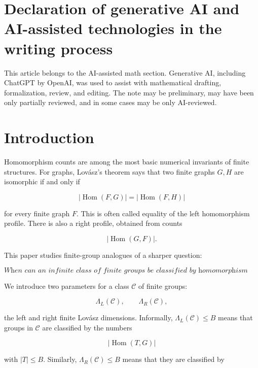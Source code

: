 \documentclass[11pt]{article}
\begin{document}
\begin{abstract}
\[
\operatorname{End}(Q)=\operatorname{Aut}(Q)\cup\{0\},
\]

and $V^Q=0$, then the coprime affine groups $V\rtimes Q$ satisfy both two-object test properties. The proof reduces hom-counts to a positive-definite exponential kernel on semisimple multiplicity vectors.
\end{abstract}

\section*{Declaration of generative AI and AI-assisted technologies in the writing process}
This article belongs to the AI-assisted math section. Generative AI, including ChatGPT by \mbox{OpenAI}, was used to assist with mathematical drafting, formalization, review, and editing. The note may be preliminary, may have been only partially reviewed, and in some cases may be only AI-reviewed.

\section{Introduction}

Homomorphism counts are among the most basic numerical invariants of finite structures. For graphs, Lovász's theorem says that two finite graphs $G,H$ are isomorphic if and only if

\[
|\operatorname{Hom}(F,G)|=|\operatorname{Hom}(F,H)|
\]

for every finite graph $F$. This is often called equality of the left homomorphism profile. There is also a right profile, obtained from counts

\[
|\operatorname{Hom}(G,F)|.
\]

This paper studies finite-group analogues of a sharper question:

\[
\textit{When can an infinite class of finite groups be classified by homomorphism counts involving only bounded-size test groups?}
\]

We introduce two parameters for a class $\mathcal C$ of finite groups:

\[
\Lambda_L(\mathcal C),
\qquad
\Lambda_R(\mathcal C),
\]

the left and right finite Lovász dimensions. Informally, $\Lambda_L(\mathcal C)\le B$ means that groups in $\mathcal C$ are classified by the numbers

\[
|\operatorname{Hom}(T,G)|
\]

with $|T|\le B$. Similarly, $\Lambda_R(\mathcal C)\le B$ means that they are classified by
\end{document}
